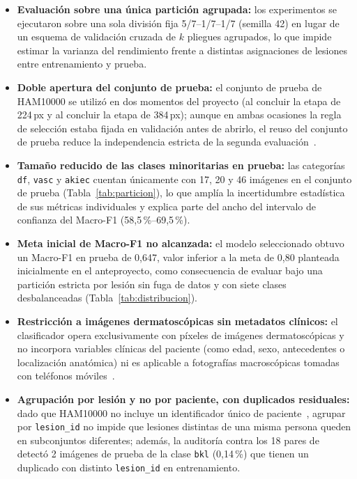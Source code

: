 \begin{itemize}
  \item \textbf{Evaluación sobre una única partición agrupada:} los experimentos se ejecutaron sobre una sola división fija 5/7--1/7--1/7 (semilla 42) en lugar de un esquema de validación cruzada de $k$ pliegues agrupados, lo que impide estimar la varianza del rendimiento frente a distintas asignaciones de lesiones entre entrenamiento y prueba.
  \item \textbf{Doble apertura del conjunto de prueba:} el conjunto de prueba de HAM10000 se utilizó en dos momentos del proyecto (al concluir la etapa de 224\,px y al concluir la etapa de 384\,px); aunque en ambas ocasiones la regla de selección estaba fijada en validación antes de abrirlo, el reuso del conjunto de prueba reduce la independencia estricta de la segunda evaluación~\cite{kapoor2023leakage}.
  \item \textbf{Tamaño reducido de las clases minoritarias en prueba:} las categorías \texttt{df}, \texttt{vasc} y \texttt{akiec} cuentan únicamente con 17, 20 y 46 imágenes en el conjunto de prueba (Tabla~\ref{tab:particion}), lo que amplía la incertidumbre estadística de sus métricas individuales y explica parte del ancho del intervalo de confianza del Macro-F1 (58,5\,\%--69,5\,\%).
  \item \textbf{Meta inicial de Macro-F1 no alcanzada:} el modelo seleccionado obtuvo un Macro-F1 en prueba de 0,647, valor inferior a la meta de 0,80 planteada inicialmente en el anteproyecto, como consecuencia de evaluar bajo una partición estricta por lesión sin fuga de datos y con siete clases desbalanceadas (Tabla~\ref{tab:distribucion}).
  \item \textbf{Restricción a imágenes dermatoscópicas sin metadatos clínicos:} el clasificador opera exclusivamente con píxeles de imágenes dermatoscópicas y no incorpora variables clínicas del paciente (como edad, sexo, antecedentes o localización anatómica) ni es aplicable a fotografías macroscópicas tomadas con teléfonos móviles~\cite{amaral2025esmo}.
  \item \textbf{Agrupación por lesión y no por paciente, con duplicados residuales:} dado que HAM10000 no incluye un identificador único de paciente~\cite{tschandl2018ham10000}, agrupar por \texttt{lesion\_id} no impide que lesiones distintas de una misma persona queden en subconjuntos diferentes; además, la auditoría contra los 18 pares de~\cite{abhishek2025quality} detectó 2 imágenes de prueba de la clase \texttt{bkl} (0,14\,\%) que tienen un duplicado con distinto \texttt{lesion\_id} en entrenamiento.

\end{itemize}
